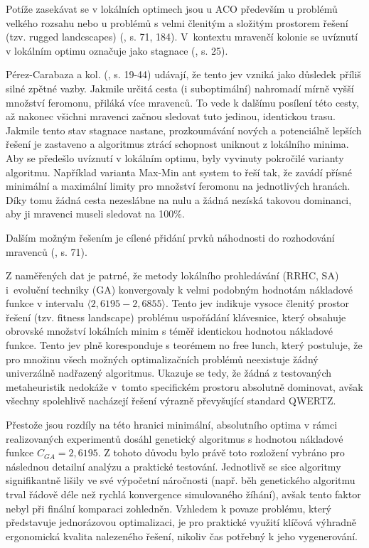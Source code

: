 \documentclass[a4paper, twoside, 12pt, czech]{article}
\begin{document}
Potíže zasekávat se v lokálních optimech jsou u ACO především u problémů velkého 
rozsahu nebo u problémů s velmi členitým a složitým 
prostorem řešení (tzv. rugged landcscapes) (\cite{Dey2024-nk}, s. 71, 184). V~kontextu mravenčí kolonie se uvíznutí 
v lokálním optimu označuje jako stagnace (\cite{Dey2024-nk}, s. 25). 

Pérez-Carabaza a kol. (\cite{Dey2024-nk}, s. 19-44) udávají, že tento jev vzniká 
jako důsledek příliš 
silné zpětné vazby. Jakmile určitá cesta (i suboptimální) nahromadí mírně vyšší 
množství feromonu, přiláká více mravenců. To vede k dalšímu posílení této cesty, až 
nakonec všichni mravenci začnou sledovat tuto jedinou, identickou trasu. Jakmile 
tento stav stagnace nastane, prozkoumávání nových a potenciálně lepších řešení 
je zastaveno a algoritmus ztrácí schopnost uniknout z lokálního minima. 
Aby se 
předešlo uvíznutí v lokálním optimu, byly vyvinuty pokročilé varianty algoritmu. 
Například varianta Max-Min ant system to řeší tak, že zavádí přísné minimální a maximální
limity pro množství feromonu na jednotlivých hranách. Díky tomu žádná cesta nezeslábne
na nulu a žádná nezíská takovou dominanci, aby ji mravenci museli sledovat na 100\space\%.

Dalším možným řešením je cílené přidání prvků náhodnosti do rozhodování mravenců
(\cite{Dey2024-nk}, s. 71).

Z naměřených dat je patrné, že metody lokálního prohledávání (RRHC, SA) i~evoluční 
techniky (GA) konvergovaly k velmi podobným hodnotám nákladové funkce v intervalu 
$\langle 2,6195 - 2,6855 \rangle $. Tento jev indikuje vysoce členitý prostor řešení (tzv. fitness 
landscape) problému uspořádání klávesnice, který obsahuje obrovské množství 
lokálních minim s téměř identickou hodnotou nákladové funkce. Tento jev plně 
koresponduje s teorémem no free lunch, který postuluje, že pro množinu všech 
možných optimalizačních problémů neexistuje žádný univerzálně nadřazený 
algoritmus. Ukazuje se tedy, že žádná z testovaných metaheuristik nedokáže v~tomto 
specifickém prostoru absolutně dominovat, avšak všechny spolehlivě nacházejí řešení 
výrazně převyšující standard QWERTZ.

Přestože jsou rozdíly na této hranici minimální, absolutního optima v rámci 
realizovaných experimentů dosáhl genetický algoritmus s hodnotou nákladové funkce
$C_{GA}=2,6195$. Z tohoto důvodu bylo právě toto rozložení vybráno pro následnou 
detailní analýzu a praktické testování.
Jednotlivě se sice algoritmy signifikantně lišily ve své výpočetní náročnosti 
(např. běh genetického algoritmu trval řádově déle než rychlá konvergence 
simulovaného žíhání), avšak tento faktor nebyl při finální komparaci zohledněn. 
Vzhledem k povaze problému, který představuje jednorázovou optimalizaci, je pro 
praktické využití klíčová výhradně ergonomická kvalita nalezeného řešení, nikoliv 
čas potřebný k jeho vygenerování.
\end{document}
